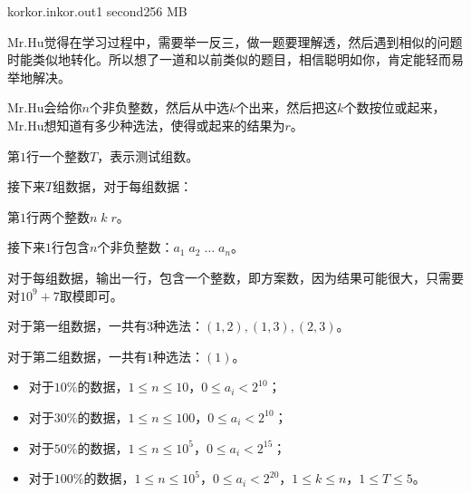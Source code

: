 \documentclass[11pt,a4paper,oneside]{article}
\begin{document}
\begin{problem}{kor}{kor.in}{kor.out}{1 second}{256 MB}	
	
	Mr.Hu觉得在学习过程中，需要举一反三，做一题要理解透，然后遇到相似的问题时能类似地转化。所以想了一道和以前类似的题目，相信聪明如你，肯定能轻而易举地解决。
	
	Mr.Hu会给你$n$个非负整数，然后从中选$k$个出来，然后把这$k$个数按位或起来，Mr.Hu想知道有多少种选法，使得或起来的结果为$r$。
	
	\InputFile
	
	第$1$行一个整数$T$，表示测试组数。
	
	接下来$T$组数据，对于每组数据：
	
	第$1$行两个整数$n \; k \; r$。
	
	接下来$1$行包含$n$个非负整数：$a_1 \; a_2 \; \dots \; a_n$。
	
	\OutputFile
	
	对于每组数据，输出一行，包含一个整数，即方案数，因为结果可能很大，只需要对$10^9 + 7$取模即可。
	
	\Example
	
	\begin{example}
	\end{example}
	
	对于第一组数据，一共有$3$种选法：$(1,2),(1,3),(2,3)$。
	
	对于第二组数据，一共有$1$种选法：$(1)$。
	
	\Note
	
	\begin{itemize}
		\item 对于$10\%$的数据，$1 \leq n \leq 10$，$0 \leq a_i < 2^{10}$；
		\item 对于$30\%$的数据，$1 \leq n \leq 100$，$0 \leq a_i < 2^{10}$；
		\item 对于$50\%$的数据，$1 \leq n \leq 10^5$，$0 \leq a_i < 2^{15}$；
		\item 对于$100\%$的数据，$1 \leq n \leq 10^5$，$0 \leq a_i < 2^{20}$，$1 \leq k \leq n$，$1 \leq T \leq 5$。
	\end{itemize}
	
\end{problem}
\end{document}
